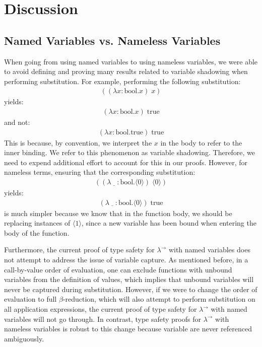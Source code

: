 \documentclass[12pt, letterpaper]{article}
\begin{document}
\section{Discussion}

\subsection{Named Variables vs. Nameless Variables}
When going from using named variables to using nameless variables, we were able to avoid defining and proving many results related to variable shadowing when performing substitution. For example, performing the following substitution:
\begin{align*}
[ \text{true} / x ] ((\lambda x : \text{bool} . x)\;x)
\end{align*}
yields:
\begin{align*}
(\lambda x : \text{bool} . x)\;\text{true}
\end{align*}
and not:
\begin{align*}
(\lambda x : \text{bool} . \text{true})\;\text{true}
\end{align*}
This is because, by convention, we interpret the $x$ in the body to refer to the inner binding. We refer to this phenomenon as variable shadowing. Therefore, we need to expend additional effort to account for this in our proofs. However, for nameless terms, ensuring that the corresponding substitution:
\begin{align*}
[ \text{true} / \langle 0 \rangle ] ((\lambda \underline{\;\;\;} : \text{bool} . \langle 0 \rangle)\;\langle 0 \rangle)
\end{align*}
yields:
\begin{align*}
(\lambda \underline{\;\;\;} : \text{bool} . \langle 0 \rangle)\;\text{true}
\end{align*}
is much simpler because we know that in the function body, we should be replacing instances of $\langle 1 \rangle$, since a new variable has been bound when entering the body of the function.

Furthermore, the current proof of type safety for $\lambda^{\to}$ with named variables does not attempt to address the issue of variable capture. As mentioned before, in a call-by-value order of evaluation, one can exclude functions with unbound variables from the definition of values, which implies that unbound variables will never be captured during substitution. However, if we were to change the order of evaluation to full $\beta$-reduction, which will also attempt to perform substitution on all application expressions, the current proof of type safety for $\lambda^{\to}$ with named variables will not go through. In contrast, type safety proofs for $\lambda^{\to}$ with nameless variables is robust to this change because variable are never referenced ambiguously.
\end{document}
